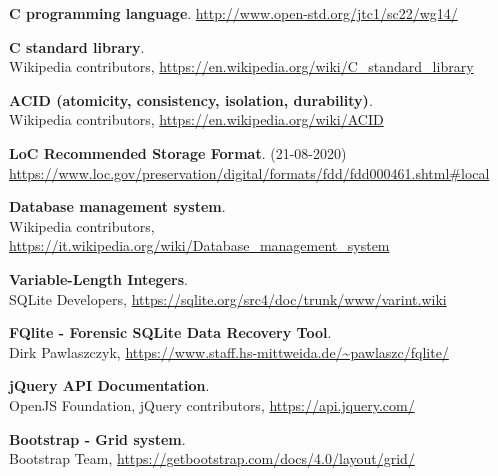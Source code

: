 \documentclass[Lau, oneside, noexaminfo]{sapthesis}
\begin{document}
	\backmatter
	\begin{thebibliography}{17}
		
		
			\textbf{C programming language}.
			\url{http://www.open-std.org/jtc1/sc22/wg14/}
			
			\textbf{C standard library}. \\
			Wikipedia contributors,
			\url{https://en.wikipedia.org/wiki/C_standard_library}
		
			\textbf{ACID (atomicity, consistency, isolation, durability)}. \\
			Wikipedia contributors,
			\url{https://en.wikipedia.org/wiki/ACID}
		
			\textbf{LoC Recommended Storage Format}. (21-08-2020) \\
			\url{https://www.loc.gov/preservation/digital/formats/fdd/fdd000461.shtml#local}

			\textbf{Database management system}. \\
			Wikipedia contributors, \url{https://it.wikipedia.org/wiki/Database_management_system}
			
			\textbf{Variable-Length Integers}. \\
			SQLite Developers, 
			\url{https://sqlite.org/src4/doc/trunk/www/varint.wiki}
			
			\textbf{FQlite - Forensic SQLite Data Recovery Tool}. \\
			Dirk Pawlaszczyk, 
			\url{https://www.staff.hs-mittweida.de/~pawlaszc/fqlite/}
		
			\textbf{jQuery API Documentation}. \\
			 OpenJS Foundation, jQuery contributors, 
			\url{https://api.jquery.com/}
		
			\textbf{Bootstrap - Grid system}. \\
			Bootstrap Team, 
			\url{https://getbootstrap.com/docs/4.0/layout/grid/}
		
			
	\end{thebibliography}
	
	
	
\end{document}
